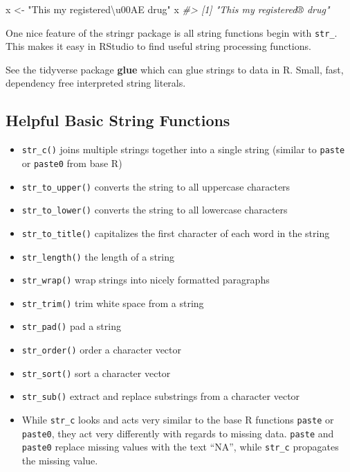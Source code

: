 \documentclass[]{book}
\newenvironment{Shaded}{\begin{snugshade}}{\end{snugshade}}
\newcommand{\CommentTok}[1]{\textcolor[rgb]{0.56,0.35,0.01}{\textit{#1}}}
\newcommand{\NormalTok}[1]{#1}
\newcommand{\StringTok}[1]{\textcolor[rgb]{0.31,0.60,0.02}{#1}}
\providecommand{\tightlist}{%
  \setlength{\itemsep}{0pt}\setlength{\parskip}{0pt}}
\newenvironment{rmdblock}[1]
  {\begin{shaded*}
  \begin{itemize}
  \renewcommand{\labelitemi}{
    \raisebox{-.7\height}[0pt][0pt]{
      {\setkeys{Gin}{width=3em,keepaspectratio}\texttt{[image: images/\#1]}}
    }
  }
  \item
  }
  {
  \end{itemize}
  \end{shaded*}
  }
\newenvironment{rmdcaution}
  {\begin{rmdblock}{caution}}
  {\end{rmdblock}}
\theoremstyle{definition}
\theoremstyle{definition}
\theoremstyle{definition}
\theoremstyle{remark}
\let\BeginKnitrBlock\begin \let\EndKnitrBlock\end
\begin{document}
\begin{Shaded}
\begin{Highlighting}[]
\NormalTok{x <-}\StringTok{ "This my registered\textbackslash{}u00AE drug"}
\NormalTok{x}
\CommentTok{#> [1] "This my registered® drug"}
\end{Highlighting}
\end{Shaded}

One nice feature of the stringr package is all string functions begin
with \texttt{str\_}. This makes it easy in RStudio to find useful string
processing functions.

\BeginKnitrBlock{rmdtip}
See the tidyverse package \textbf{glue} which can glue strings to data
in R. Small, fast, dependency free interpreted string literals.
\EndKnitrBlock{rmdtip}

\hypertarget{helpful-basic-string-functions}{%
\subsection{Helpful Basic String
Functions}\label{helpful-basic-string-functions}}

\begin{itemize}
\tightlist
\item
  \texttt{str\_c()} joins multiple strings together into a single string
  (similar to \texttt{paste} or \texttt{paste0} from base R)
\item
  \texttt{str\_to\_upper()} converts the string to all uppercase
  characters
\item
  \texttt{str\_to\_lower()} converts the string to all lowercase
  characters
\item
  \texttt{str\_to\_title()} capitalizes the first character of each word
  in the string
\item
  \texttt{str\_length()} the length of a string
\item
  \texttt{str\_wrap()} wrap strings into nicely formatted paragraphs
\item
  \texttt{str\_trim()} trim white space from a string
\item
  \texttt{str\_pad()} pad a string
\item
  \texttt{str\_order()} order a character vector
\item
  \texttt{str\_sort()} sort a character vector
\item
  \texttt{str\_sub()} extract and replace substrings from a character
  vector
\end{itemize}

\begin{rmdcaution}
While \texttt{str\_c} looks and acts very similar to the base R
functions \texttt{paste} or \texttt{paste0}, they act very differently
with regards to missing data. \texttt{paste} and \texttt{paste0} replace
missing values with the text ``NA'', while \texttt{str\_c} propagates
the missing value.
\end{rmdcaution}
\end{document}
